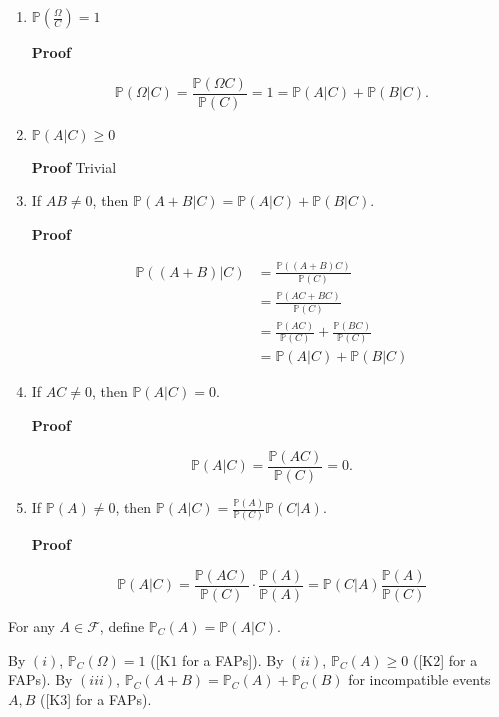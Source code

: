 \documentclass[12pt]{article}
\newcommand{\prob}[1]{\mathbb{P}(#1)}
\begin{document}
\begin{enumerate}[label=(\roman*)]
\item $\prob{\frac{\Omega}{C}} = 1$

\noindent
\textbf{Proof} 

\begin{equation}
\prob{\Omega \lvert C} = \frac{\prob{\Omega C}}{\prob{C}} = 1 = \prob{A \lvert C} + \prob{B \lvert C}.
\end{equation}


\item $\prob{A \lvert C} \geq 0$

\noindent
\textbf{Proof} Trivial

\item If $AB \neq 0$, then $\prob{A+B \lvert C} = \prob{A \lvert C} + \prob{B \lvert C}$.

\noindent
\textbf{Proof} 

\begin{align*}
\prob{(A+B) \lvert C} & = \frac{\prob{(A+B) C}}{\prob{C}} \\
& = \frac{\prob{AC + BC}}{\prob{C}} \\
& = \frac{\prob{AC}}{\prob{C}} + \frac{\prob{BC}}{\prob{C}} \\
& = \prob{A \lvert C} + \prob{B \lvert C}
\end{align*}

\item If $AC \neq 0$, then $\prob{A \lvert C} = 0$.

\noindent
\textbf{Proof} 

\begin{equation*}
\prob{A \lvert C} = \frac{\prob{AC}}{\prob{C}} = 0.
\end{equation*}

\item If $\prob{A} \neq 0$, then $\prob{A \lvert C} = \frac{\prob{A}}{\prob{C}} \prob{C \lvert A}$.

\noindent
\textbf{Proof} 

\begin{equation*}
\prob{A \lvert C} = \frac{\prob{AC}}{\prob{C}} \cdot \frac{\prob{A}}{\prob{A}} = \prob{C \lvert A} \frac{\prob{A}}{\prob{C}}
\end{equation*}

\end{enumerate}

\noindent
For any $A \in \mathcal{F}$, define $\mathbb{P}_C(A) = \prob{A \lvert C}$. 

\vspace*{.3cm}
\noindent
By $(i)$, $\mathbb{P}_C(\Omega) = 1$ ([K$1$ for a FAPs]). 
By $(ii)$, $\mathbb{P}_C(A) \geq 0$ ([K$2$] for a FAPs). 
By $(iii)$, $\mathbb{P}_C(A+B) = \mathbb{P}_C(A) + \mathbb{P}_C(B)$ for incompatible events $A,B$ ([K$3$] for a FAPs). 
\end{document}
